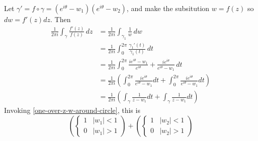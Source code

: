 \documentclass{homework}
\begin{document}
                                                                                                  \begin{solution}
                                                                                                  Let $\gamma' = f\circ \gamma = (e^{i\theta} - w_1)(e^{i\theta} - w_2)$, and make the subsitution $w=f(z)$ so $dw = f'(z)dz$.
                                                                                                  Then
                                                                                                  \begin{align*}
                                                                                                  \frac{1}{2\pi i} \int_\gamma \frac{f'(z)}{f(z)} \, dz
                                                                                                  &= \frac{1}{2\pi i} \int_{\gamma_1}\frac{1}{w} \, dw\\
                                                                                                  &= \frac{1}{2\pi i} \int_0^{2\pi} \frac{\gamma_1'(t)}{\gamma_1(t)} \, dt\\
                                                                                                  &= \frac{1}{2\pi i} \int_0^{2\pi} \frac{ie^{i\theta} - w_1}{e^{i\theta}} + \frac{ie^{i\theta}}{e^{i\theta} - w_1} \, dt\\
                                                                                                  &= \frac{1}{2\pi i} (\int_0^{2\pi} \frac{ie^{i\theta}}{e^{i\theta} - w_1} dt + \int_0^{2\pi} \frac{ie^{i\theta}}{e^{i\theta} - w_1}dt )\\
                                                                                                  &= \frac{1}{2\pi i} (\int_{\gamma} \frac{1}{z - w_1} dt + \int_{\gamma} \frac{1}{z - w_1}dt )
                                                                                                  \end{align*}
                                                                                                  Invoking \ref{one-over-z-w-around-circle}, this is
                                                                                                  \[\left(\begin{cases}1 & |w_1| < 1\\ 0 & |w_1| > 1\end{cases} \right) +
                                                                                                  \left(\begin{cases}1 & |w_2| < 1\\ 0 & |w_2| > 1\end{cases}\right)\]
                                                                                                  \end{solution}
\end{document}
